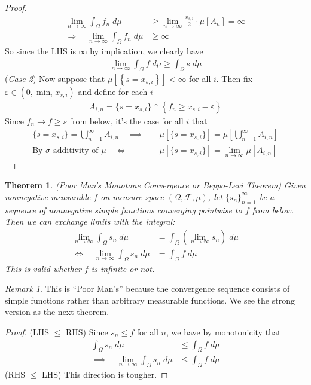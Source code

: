 \documentclass[12pt]{article}
\theoremstyle{plain}
\newtheorem{thm}{Theorem}[section]
\theoremstyle{definition}
\theoremstyle{remark}
\newtheorem*{rmk}{Remark}
\newcommand{\limn}{\lim_{n\rightarrow\infty}}
\newcommand{\ra}{\rightarrow}
\newcommand{\sF}{\mathscr{F}}
\newcommand{\ninf}{_{n=1}^\infty}
\begin{document}
\begin{proof}
\begin{align*}
  \limn \int_\Omega f_n \; d\mu
  &\geq
  \limn
  \frac{x_{s,i}}{2} \cdot \mu[A_n] = \infty \\
  \Rightarrow\quad
  \limn \int_\Omega f_n \; d\mu
  &\geq
  \infty
\end{align*}
So since the LHS is $\infty$ by implication, we clearly have
\begin{align*}
  \limn \int_\Omega f\;d\mu \geq \int_\Omega s\;d\mu
\end{align*}
(\emph{Case 2}) Now suppose that
$\mu[\left\{ s=x_{s,i} \right\}] <\infty$ for all $i$.
Then fix $\varepsilon \in (0,\min_i x_{s,i})$ and define for each $i$
\begin{align*}
  A_{i,n}
  =
  \{s = x_{s,i}\}
  \cap
  \left\{ f_n \geq x_{s,i} -\varepsilon\right\}
\end{align*}
Since $f_n\ra f \geq s$ from below, it's the case for all $i$ that
\begin{align*}
  \{s=x_{s,i}\} = \bigcup\ninf A_{i,n}
  \quad\implies&\quad
  \mu[\{s=x_{s,i}\}] = \mu\left[\bigcup\ninf A_{i,n}\right] \\
  \text{By $\sigma$-additivity of $\mu$}
  \quad \iff&\quad
  \mu[\{s=x_{s,i}\}] = \limn \mu\left[A_{i,n}\right]
\end{align*}
\end{proof}


\begin{thm}\emph{(Poor Man's Monotone Convergence or Beppo-Levi Theorem)}
Given nonnegative measurable $f$ on measure space $(\Omega,\sF,\mu)$,
let $\{s_n\}\ninf$ be a sequence of nonnegative simple functions
converging pointwise to $f$ from below.
Then we can exchange limits with the integral:
\begin{align*}
    \lim_{n\rightarrow\infty} \int_\Omega s_n \; d\mu &=
    \int_\Omega \left(\lim_{n\rightarrow\infty} s_n\right) \; d\mu \\
    \iff\quad
    \lim_{n\rightarrow\infty} \int_\Omega s_n \; d\mu &=
    \int_\Omega f \; d\mu
\end{align*}
This is valid whether $f$ is infinite or not.
\end{thm}
\begin{rmk}
This is ``Poor Man's'' because the convergence sequence consists of
simple functions rather than arbitrary measurable functions.
We see the strong version as the next theorem.
\end{rmk}
\begin{proof}
(LHS $\leq$ RHS) Since $s_n\leq f$ for all $n$, we have by monotonicity
that
\begin{align*}
  \int_\Omega s_n \;d\mu
  &\leq
  \int_\Omega f \;d\mu \\
  \implies\quad
  \limn \int_\Omega s_n \;d\mu
  &\leq
  \int_\Omega f \;d\mu
\end{align*}
(RHS $\leq$ LHS) This direction is tougher.
\end{proof}
\end{document}
